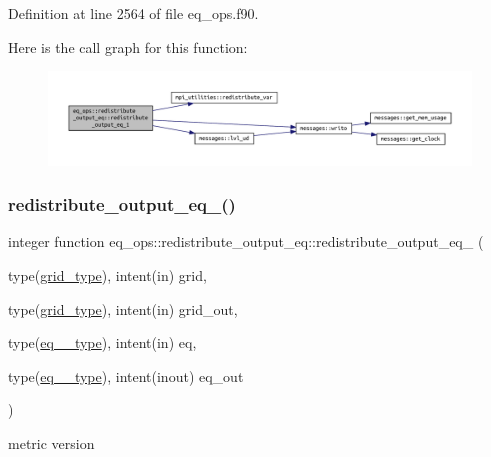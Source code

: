 Definition at line 2564 of file eq\+\_\+ops.\+f90.

Here is the call graph for this function\+:\nopagebreak
\begin{figure}[H]
\begin{center}
\leavevmode
\includegraphics[width=350pt]{interfaceeq__ops_1_1redistribute__output__eq_ac77911cf8c4631896ad2d0fff66e6893_cgraph}
\end{center}
\end{figure}
\mbox{\label{interfaceeq__ops_1_1redistribute__output__eq_afdbe3be15436f6abd965bd301ffd819d}} 
\subsubsection{\texorpdfstring{redistribute\+\_\+output\+\_\+eq\+\_()}{redistribute\_output\_eq\_2()}}
{\footnotesize\ttfamily integer function eq\+\_\+ops\+::redistribute\+\_\+output\+\_\+eq\+::redistribute\+\_\+output\+\_\+eq\+\_ (\begin{DoxyParamCaption}\item[{type(\hyperlink{structgrid__vars_1_1grid__type}{grid\+\_\+type}), intent(in)}]{grid,  }\item[{type(\hyperlink{structgrid__vars_1_1grid__type}{grid\+\_\+type}), intent(in)}]{grid\+\_\+out,  }\item[{type(\hyperlink{structeq__vars_1_1eq__2__type}{eq\+\_\+2\+\_\+type}), intent(in)}]{eq,  }\item[{type(\hyperlink{structeq__vars_1_1eq__2__type}{eq\+\_\+2\+\_\+type}), intent(inout)}]{eq\+\_\+out }\end{DoxyParamCaption})}



metric version 


